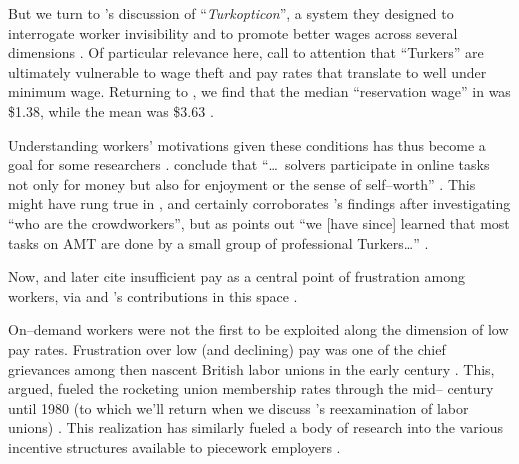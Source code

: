\documentclass[trackingWork]{subfiles}
\begin{document}
{\begin{appendices}
    But we turn to \citeauthor{turkopticon}'s discussion of ``\textit{Turkopticon}'',
    a system they designed to interrogate worker invisibility and to promote better wages across several dimensions
    \cite{turkopticon}.
    Of particular relevance here,
    \citeauthor{turkopticon} call to attention that ``Turkers'' are ultimately vulnerable to
    wage theft and
    pay rates that translate to well under minimum wage.
    Returning to \citeauthor{laborEconomicsOfCrowdsourcingHorton},
    we find that the median ``reservation wage'' in \citeyear{laborEconomicsOfCrowdsourcingHorton}
    was \$1.38, while the mean was \$3.63
    \cite{laborEconomicsOfCrowdsourcingHorton}.

    Understanding workers' motivations given these conditions has thus become a goal for some researchers
    \cite{whyWouldAnyoneBrewer}.
    \citeauthor{Sun20111033} conclude that
    ``\dots~solvers participate in online tasks
    not only for money
    but also for enjoyment
    or the sense of self--worth''
    \cite{Sun20111033}.
    This might have rung true in \citeyear{Sun20111033},
    and certainly corroborates \citeauthor{Ross}'s findings after investigating
    ``who are the crowdworkers'',
    but as \citeauthor{whoareNOTtheTurkers} points out
    ``we [have since] learned that most tasks on AMT are done by a small group of professional Turkers\dots''
    \cite{Ross,whoareNOTtheTurkers}.

    Now, \citeauthor{turkopticon}
    and later
    \citeauthor{dynamo} cite insufficient pay as a central point of frustration among workers,
    via \citeauthor{irani2015cultural} and \citeauthor{dawnDigitalSweatshopCushing}'s contributions in this space
    \cite{dynamo,irani2015cultural,dawnDigitalSweatshopCushing,turkopticon}.

    On--demand workers were not the first to be exploited along the dimension of low pay rates.
    Frustration over low (and declining) pay was one of the chief grievances among then nascent
    British labor unions in the early  century
    \cite{turner1952trade}.
    This, \citeauthor{ebbinghaus1999institutions} argued,
    fueled the rocketing union membership rates through the mid-- century until 1980
    (to which we'll return when we discuss \citeauthor{levi2009union}'s reexamination of labor unions)
    \cite{ebbinghaus1999institutions,levi2009union}.
    This realization has similarly fueled a body of research into
    the various incentive structures available to piecework employers
    \cite{roy1953work}.



\end{appendices}}
\end{document}
